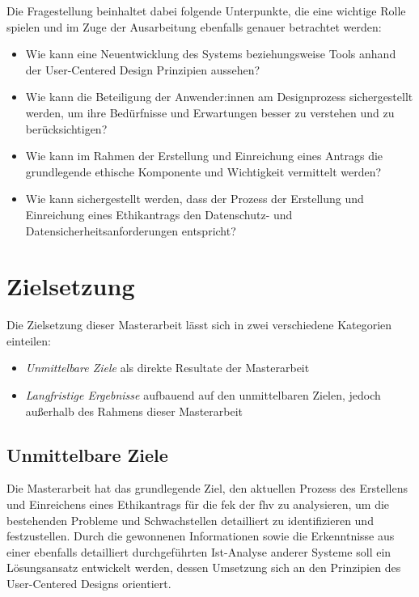 \documentclass[a4paper,12pt,twoside,numbers=noendperiod]{scrreprt}
\begin{document}
\medskip

Die Fragestellung beinhaltet dabei folgende Unterpunkte, die eine wichtige Rolle spielen und im Zuge der Ausarbeitung ebenfalls genauer betrachtet werden:
\begin{itemize}
      \item Wie kann eine Neuentwicklung des Systems beziehungsweise Tools anhand der User-Centered Design Prinzipien aussehen?
    \item Wie kann die Beteiligung der Anwender:innen am Designprozess sichergestellt werden, um ihre Bedürfnisse und Erwartungen besser zu verstehen und zu berücksichtigen?
    \item Wie kann im Rahmen der Erstellung und Einreichung eines Antrags die grundlegende ethische Komponente und Wichtigkeit vermittelt werden?
    \item Wie kann sichergestellt werden, dass der Prozess der Erstellung und Einreichung eines Ethikantrags den Datenschutz- und Datensicherheitsanforderungen entspricht?
\end{itemize}

\section{Zielsetzung}
\label{sec:zielsetzung}

Die Zielsetzung dieser Masterarbeit lässt sich in zwei verschiedene Kategorien einteilen:
\begin{itemize}
    \item \textit{Unmittelbare Ziele} als direkte Resultate der Masterarbeit
    \item \textit{Langfristige Ergebnisse} aufbauend auf den unmittelbaren Zielen, jedoch außerhalb des Rahmens dieser Masterarbeit
\end{itemize}

\subsection{Unmittelbare Ziele}
\label{sub-sec:unmittelbare-ziele}

Die Masterarbeit hat das grundlegende Ziel, den aktuellen Prozess des Erstellens und Einreichens eines Ethikantrags für die \acl{fek} der \acl{fhv} zu analysieren, um die bestehenden Probleme und Schwachstellen detailliert zu identifizieren und festzustellen. Durch die gewonnenen Informationen sowie die Erkenntnisse aus einer ebenfalls detailliert durchgeführten Ist-Analyse anderer Systeme soll ein Lösungsansatz entwickelt werden, dessen Umsetzung sich an den Prinzipien des User-Centered Designs orientiert.
\end{document}
